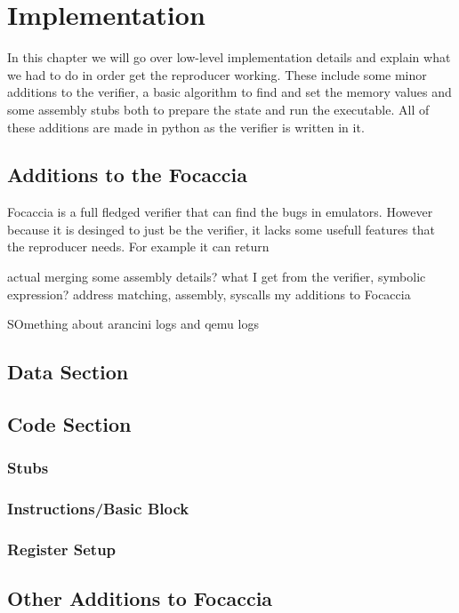 
\chapter{Implementation}\label{chapter:implementation}
In this chapter we will go over low-level implementation details and explain what we had to do in order get the reproducer working.
These include some minor additions to the verifier, a basic algorithm to find and set the memory values and some assembly stubs both to prepare the state and run the executable.
All of these additions are made in python as the verifier is written in it.

\section{Additions to the Focaccia}
Focaccia is a full fledged verifier that can find the bugs in emulators.
However because it is desinged to just be the verifier, it lacks some usefull features that the reproducer needs.
For example it can return 

actual merging some assembly details?
what I get from the verifier, symbolic expression?
address matching, assembly, syscalls
my additions to Focaccia

SOmething about arancini logs and qemu logs

\section{Data Section}
\section{Code Section}
\subsection{Stubs}
\subsection{Instructions/Basic Block}
\subsection{Register Setup}

\section{Other Additions to Focaccia}